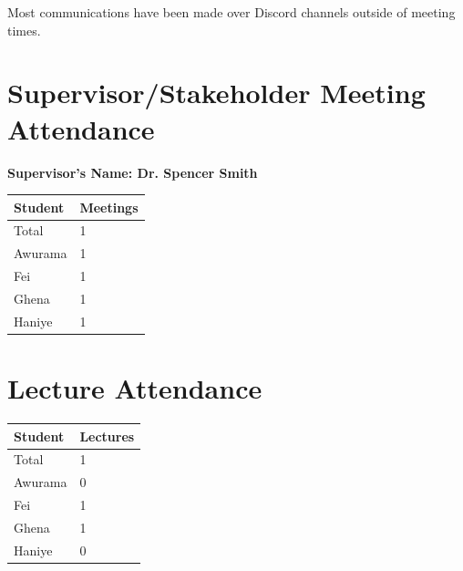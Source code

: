 \documentclass{article}
\begin{document}
Most communications have been made over Discord channels outside of meeting times.

\section{Supervisor/Stakeholder Meeting Attendance}


\noindent \textbf{Supervisor's Name: Dr. Spencer Smith}

\begin{table}[H]
\centering
\begin{tabular}{ll}
\toprule
\textbf{Student} & \textbf{Meetings}\\
\midrule
Total & 1\\
Awurama & 1\\
Fei & 1\\
Ghena & 1\\
Haniye & 1\\
\bottomrule
\end{tabular}
\end{table}


\section{Lecture Attendance}



\begin{table}[H]
\centering
\begin{tabular}{ll}
\toprule
\textbf{Student} & \textbf{Lectures}\\
\midrule
Total & 1\\
Awurama & 0\\
Fei & 1\\
Ghena & 1\\
Haniye & 0\\
\bottomrule
\end{tabular}
\end{table}
\end{document}
